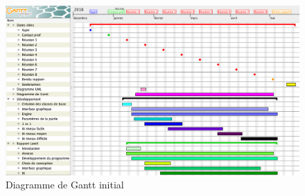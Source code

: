 \documentclass[11pt,a4paper]{article}
\begin{document}
\vspace{10px}

\begin{figure}[htbp]
\begin{center}
\includegraphics[width=1\textwidth]{figures/gantt}
\caption{Diagramme de Gantt initial}
\label{fig:Screenshot4}
\end{center}
\end{figure}

\newpage
\end{document}
